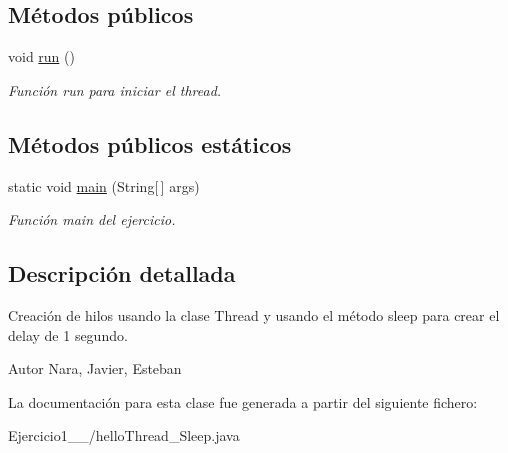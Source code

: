 \subsection*{Métodos públicos}
\begin{DoxyCompactItemize}
\item 
\hypertarget{class_ejercicio1__1__3_1_1hello_thread___sleep_ae2d451162bdcec0dfe655a55f03782d9}{}void \hyperlink{class_ejercicio1__1__3_1_1hello_thread___sleep_ae2d451162bdcec0dfe655a55f03782d9}{run} ()\label{class_ejercicio1__1__3_1_1hello_thread___sleep_ae2d451162bdcec0dfe655a55f03782d9}

\begin{DoxyCompactList}\small\item\em Función run para iniciar el thread. \end{DoxyCompactList}\end{DoxyCompactItemize}
\subsection*{Métodos públicos estáticos}
\begin{DoxyCompactItemize}
\item 
\hypertarget{class_ejercicio1__1__3_1_1hello_thread___sleep_aed9e494f20a5978895747a9b78bdde60}{}static void \hyperlink{class_ejercicio1__1__3_1_1hello_thread___sleep_aed9e494f20a5978895747a9b78bdde60}{main} (String\mbox{[}$\,$\mbox{]} args)\label{class_ejercicio1__1__3_1_1hello_thread___sleep_aed9e494f20a5978895747a9b78bdde60}

\begin{DoxyCompactList}\small\item\em Función main del ejercicio. \end{DoxyCompactList}\end{DoxyCompactItemize}


\subsection{Descripción detallada}
Creación de hilos usando la clase Thread y usando el método sleep para crear el delay de 1 segundo. 

\begin{DoxyAuthor}{Autor}
Nara, Javier, Esteban 
\end{DoxyAuthor}


La documentación para esta clase fue generada a partir del siguiente fichero\+:\begin{DoxyCompactItemize}
\item 
Ejercicio1\+\_\+\_/hello\+Thread\+\_\+\+Sleep.\+java\end{DoxyCompactItemize}

